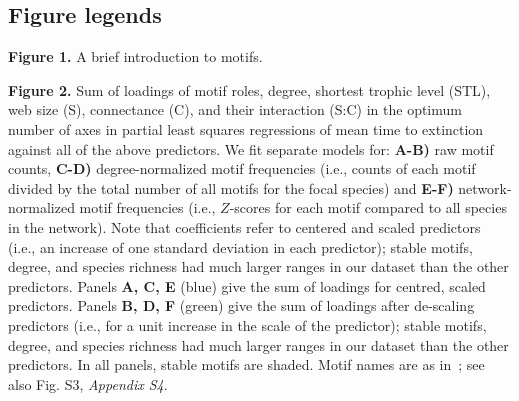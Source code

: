 \documentclass[12pt]{article}
\begin{document}
\begin{spacing}{2.0}
\section*{Figure legends}

        \textbf{Figure 1.} A brief introduction to motifs.

    \vspace{24pt}

    \noindent \textbf{Figure 2.} Sum of loadings of motif roles, degree, shortest trophic level (STL), web size (S), connectance (C), and their interaction (S:C) in the optimum number of axes in partial least squares regressions of mean time to extinction against all of the above predictors. We fit separate models for: \textbf{A-B)} raw motif counts, \textbf{C-D)} degree-normalized motif frequencies (i.e., counts of each motif divided by the total number of all motifs for the focal species) and \textbf{E-F)} network-normalized motif frequencies (i.e., $Z$-scores for each motif compared to all species in the network). Note that coefficients refer to centered and scaled predictors (i.e., an increase of one standard deviation in each predictor); stable motifs, degree, and species richness had much larger ranges in our dataset than the other predictors.
		Panels \textbf{A, C, E} (blue) give the sum of loadings for centred, scaled predictors.
		Panels \textbf{B, D, F} (green) give the sum of loadings after de-scaling predictors (i.e., for a unit increase in the scale of the predictor); stable motifs, degree, and species richness had much larger ranges in our dataset than the other predictors.
		In all panels, stable motifs are shaded. Motif names are as in~\citet{Stouffer2007}; see also Fig. S3, \emph{Appendix S4}.


    \vspace{24pt}


\end{spacing}
\end{document}
